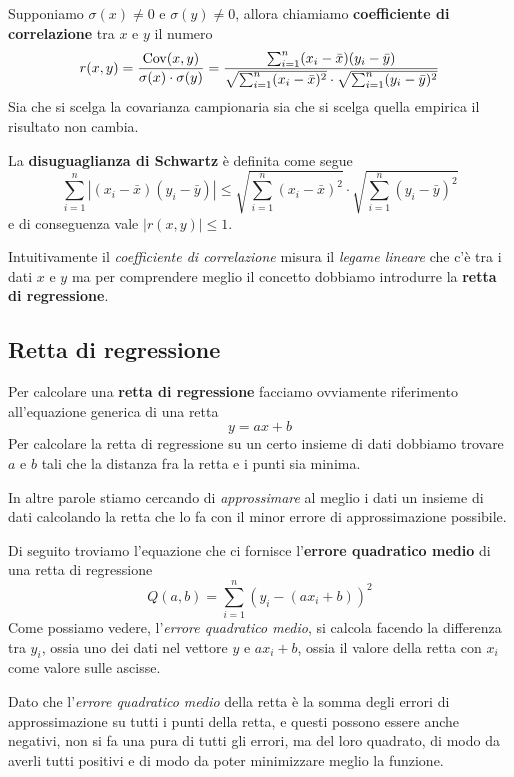 \begin{definition}
	Supponiamo $\sigma (x) \neq 0$ e $\sigma (y) \neq 0$, allora chiamiamo
	\textbf{coefficiente di correlazione} tra $x$ e $y$ il numero
	\[
		r(x, y) = \frac{\operatorname{Cov} (x, y)}{\sigma (x) \cdot \sigma (y)} =
		\frac{\sum_{i=1}^n (x_i - \bar{x})(y_i - \bar{y})}
		{\sqrt{\sum_{i=1}^n (x_i - \bar{x})^2} \cdot
			\sqrt{\sum_{i=1}^n (y_i - \bar{y})^2}}
	\]
	Sia che si scelga la covarianza campionaria sia che si scelga quella empirica il risultato
	non cambia.
\end{definition}

\begin{definition}
	La \textbf{disuguaglianza di Schwartz} è definita come segue
	\[
		\sum_{i=1}^n |(x_i - \bar{x}) (y_i - \bar{y})| \leq
		\sqrt{\sum_{i=1}^n (x_i - \bar{x})^2} \cdot \sqrt{\sum_{i=1}^n (y_i - \bar{y})^2}
	\]
	e di conseguenza vale $|r(x, y)| \leq 1$.
\end{definition}

Intuitivamente il \emph{coefficiente di correlazione} misura il \emph{legame lineare} che c'è tra
i dati $x$ e $y$ ma per comprendere meglio il concetto dobbiamo introdurre la
\textbf{retta di regressione}.

\subsection{Retta di regressione}
Per calcolare una \textbf{retta di regressione} facciamo ovviamente riferimento all'equazione
generica di una retta
\[ y = a x + b \]
Per calcolare la retta di regressione su un certo insieme di dati dobbiamo trovare $a$ e $b$ tali
che la distanza fra la retta e i punti sia minima.

In altre parole stiamo cercando di \emph{approssimare} al meglio i dati un insieme di dati
calcolando la retta che lo fa con il minor errore di approssimazione possibile.

Di seguito troviamo l'equazione che ci fornisce l'\textbf{errore quadratico medio} di una retta di
regressione
\[ Q(a, b) = \sum_{i=1}^n (y_i - (a x_i + b))^2 \]
Come possiamo vedere, l'\emph{errore quadratico medio}, si calcola facendo la differenza tra
$y_i$, ossia uno dei dati nel vettore $y$ e $a x_i + b$, ossia il valore della retta con $x_i$
come valore sulle ascisse.

Dato che l'\emph{errore quadratico medio} della retta è la somma degli errori di approssimazione
su tutti i punti della retta, e questi possono essere anche negativi, non si fa una pura di tutti
gli errori, ma del loro quadrato, di modo da averli tutti positivi e di modo da poter minimizzare
meglio la funzione.

